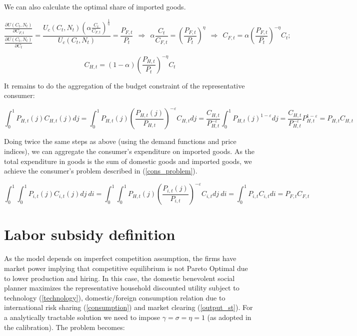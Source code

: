 \documentclass{article}
\begin{document}
We can also calculate the optimal share of imported goods.

\begin{equation}
    \displaystyle \frac{\displaystyle \frac{\partial U(C_t,N_t)}{\displaystyle \partial C_{F,t}}}{\frac{\displaystyle \partial U(C_t,N_t)}{\displaystyle \partial C_t}} = \frac{\displaystyle U_c(C_t,N_t) \left( \alpha \frac{C_t}{C_{F,t}} \right)^{\frac{1}{\eta}}}{\displaystyle U_c(C_t,N_t) } = \frac{P_{F,t}}{P_t} \ \ \Rightarrow \ \ \alpha \frac{C_t}{C_{F,t}} = \left( \frac{P_{F,t}}{P_t} \right)^\eta \ \ \Rightarrow \ \ C_{F,t} = \alpha \left( \frac{P_{F,t}}{P_t} \right)^{-\eta}C_t;
\end{equation}

\begin{equation}
    C_{H,t} = (1-\alpha)\left( \frac{P_{H,t}}{P_t} \right)^{-\eta}C_t
\end{equation}

It remains to do the aggregation of the budget constraint of the representative consumer:

\begin{equation}
    \displaystyle \int_0^1 P_{H,t}(j)C_{H,t}(j)dj = \int_0^1P_{H,t}(j)\left( \frac{P_{H,t}(j)}{P_{H,t}}\right)^{-\varepsilon}C_{H,t}dj = \frac{C_{H,t}}{P_{H,t}^{-\varepsilon}}\int_0^1P_{H,t}(j)^{1-\varepsilon}dj = \frac{C_{H,t}}{P_{H,t}^{-\varepsilon}}P_{H,t}^{1-\varepsilon} = P_{H,t}C_{H,t}
\end{equation}

Doing twice the same steps as above (using the demand functions and price indices), we can aggregate the consumer's expenditure on imported goods. As the total expenditure in goods is the sum of domestic goods and imported goods, we achieve the consumer's problem described in (\ref{cons_problem}).

\begin{equation}
    \displaystyle \int_0^1\int_0^1 P_{i,t}(j)C_{i,t}(j)dj\ di = \int_0^1\int_0^1 P_{H,t}(j)\left( \frac{P_{i,t}(j)}{P_{i,t}}\right)^{-\varepsilon}C_{i,t}dj \ di = \int_0^1 P_{i,t}C_{i,t} di = P_{F,t}C_{F,t}  
\end{equation}

\section{Labor subsidy definition}
As the model depends on imperfect competition assumption, the firms have market power implying that competitive equilibrium is not Pareto Optimal due to lower production and hiring. In this case, the domestic benevolent social planner maximizes the representative household discounted utility subject to technology (\ref{technology}), domestic/foreign consumption relation due to international risk sharing (\ref{consumption}) and market clearing (\ref{output_st}). For a analytically tractable solution we need to impose $\gamma = \sigma = \eta = 1$ (as adopted in the calibration). The problem becomes:
\end{document}
